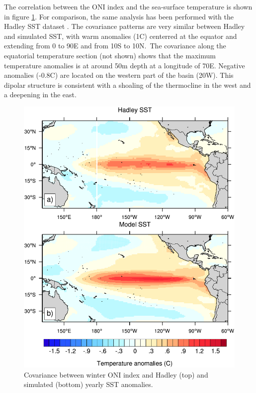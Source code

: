 The correlation between the ONI index and the sea-surface temperature is shown in figure \ref{fig:cov-sst}. For comparison, the same analysis has been performed with the Hadley SST dataset \citep{raynerGlobalAnalysesSea2003}.
The covariance patterns are very similar between Hadley and simulated SST, with warm anomalies (1\degree C) centerred at the equator and extending from 0 to 90\degree E and from 10\degree S to 10N.\ 
The covariance along the equatorial temperature section 
(not shown) shows that the maximum temperature anomalies is at around 50m depth at a longitude of 70\degree E. Negative anomalies (-0.8\degree C) are located on the western part of the basin (20\degree W). This dipolar structure is consistent with a shoaling of the thermocline in the west and a deepening in the east.\\

\begin{figure}[h!]
	\centering
	\includegraphics[scale=0.75] {figs/covariance_maps_hadley_model.pdf}
	\caption{Covariance between winter ONI index and Hadley (top) and simulated (bottom) yearly SST anomalies.}
	\label{fig:cov-sst}
\end{figure}

